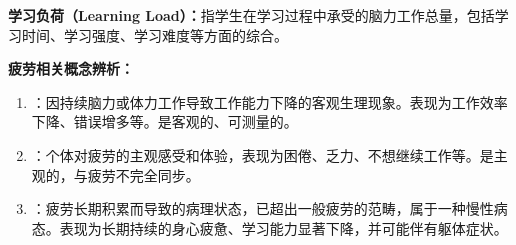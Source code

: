 \begin{defbox}
\textbf{学习负荷（Learning Load）：}指学生在学习过程中承受的脑力工作总量，包括学习时间、学习强度、学习难度等方面的综合。

\textbf{疲劳相关概念辨析：}

\begin{enumerate}[leftmargin=*]
    \item {}：因持续脑力或体力工作导致工作能力下降的客观生理现象。表现为工作效率下降、错误增多等。是客观的、可测量的。
    \item {}：个体对疲劳的主观感受和体验，表现为困倦、乏力、不想继续工作等。是主观的，与疲劳不完全同步。
    \item {}：疲劳长期积累而导致的病理状态，已超出一般疲劳的范畴，属于一种慢性病态。表现为长期持续的身心疲惫、学习能力显著下降，并可能伴有躯体症状。
\end{enumerate}
\end{defbox}

